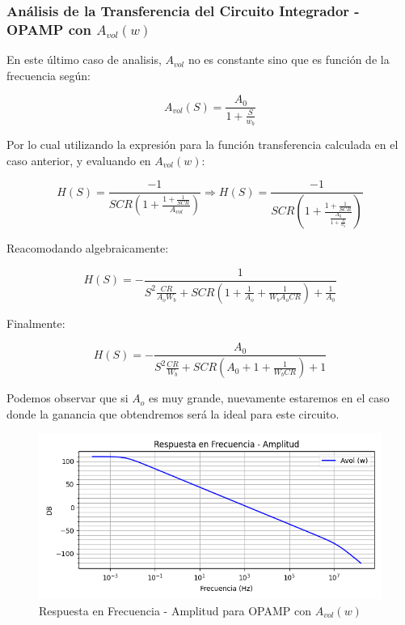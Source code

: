 \subsubsection{Análisis de la Transferencia del Circuito Integrador - OPAMP con $A_{vol}(w)$}

En este último caso de analisis, $A_{vol}$ no es constante sino que es función de la frecuencia según:

$$A_{vol}(S)=\frac{A_0}{1+\frac{S}{w_b}}$$

Por lo cual utilizando la expresión para la función transferencia calculada en el caso anterior, y evaluando en $A_{vol}(w)$:

$$H(S)= \frac{-1}{SCR(1+\frac{1+\frac{1}{SCR}}{A_{vol}})}\Longrightarrow H(S)= \frac{-1}{SCR(1+\frac{1+\frac{1}{SCR}}{\frac{A_0}{1+\frac{S}{w_b}}})}$$ 

Reacomodando algebraicamente:

$$H(S)=- \frac{1}{S^2\frac{CR}{A_oW_b}+SCR(1 + \frac{1}{A_o}+\frac{1}{W_bA_oCR}) + \frac{1}{A_0}}$$

Finalmente:

$$H(S)=- \frac{{A_0}}{S^2\frac{CR}{W_b}+SCR({A_0} + 1+\frac{1}{W_bCR}) + 1 }$$

Podemos observar que si $A_o$ es muy grande, nuevamente estaremos en el caso donde la ganancia que obtendremos será la ideal para este circuito.

\begin{figure}[H]
    \centering 
    \includegraphics [scale=1] {../Ejercicio3-CircuitoIntegradoresyDerivadores/Imagenes/teorico-avol-w-integrador-amplitud.png} 
    \caption{Respuesta en Frecuencia - Amplitud para OPAMP con $A_{vol}(w)$}
    \label{fig:emptyPlotTool}
\end{figure}

